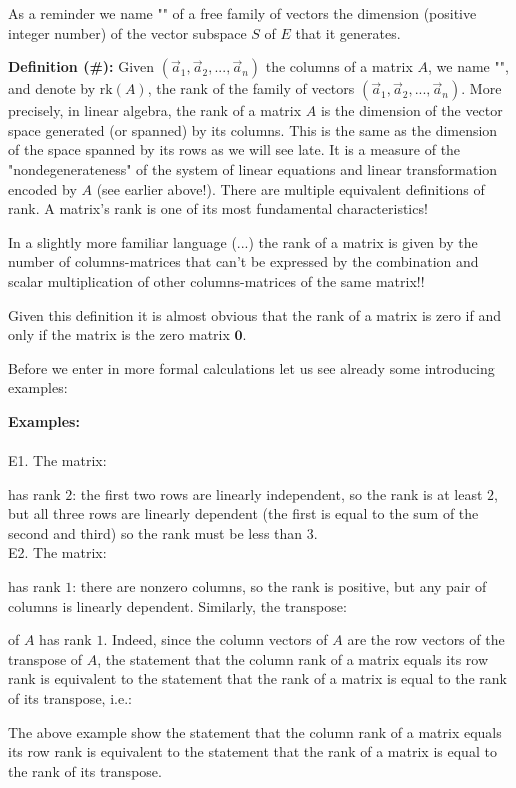 	As a reminder we name "" of a free family of vectors the dimension (positive integer number) of the vector subspace $S$ of $E$ that it generates.
	
	\textbf{Definition (\#\mydef):} Given $(\vec{a}_1,\vec{a}_2,...,\vec{a}_n)$ the columns of a matrix $A$, we name "", and denote by $\text{rk}(A)$, the rank of the family of vectors $(\vec{a}_1,\vec{a}_2,...,\vec{a}_n)$. More precisely, in linear algebra, the rank of a matrix $A$ is the dimension of the vector space generated (or spanned) by its columns. This is the same as the dimension of the space spanned by its rows as we will see late. It is a measure of the "nondegenerateness" of the system of linear equations and linear transformation encoded by $A$ (see earlier above!). There are multiple equivalent definitions of rank. A matrix's rank is one of its most fundamental characteristics!
	
	In a slightly more familiar language (...) the rank of a matrix is given by the number of columns-matrices that can't be expressed by the combination and scalar multiplication of other columns-matrices of the same matrix!!
	
	Given this definition it is almost obvious that the rank of a matrix is zero if and only if the matrix is the zero matrix $\mathbf{0}$.
	
	Before we enter in more formal calculations let us see already some introducing examples:
	\begin{tcolorbox}[colframe=black,colback=white,sharp corners]
	\textbf{{\Large {}}Examples:}\\\\
	E1. The matrix:
	
	has rank $2$: the first two rows are linearly independent, so the rank is at least $2$, but all three rows are linearly dependent (the first is equal to the sum of the second and third) so the rank must be less than $3$.\\
	
	E2. The matrix:
	
	has rank $1$: there are nonzero columns, so the rank is positive, but any pair of columns is linearly dependent. Similarly, the transpose:
	
	of $A$ has rank $1$. Indeed, since the column vectors of $A$ are the row vectors of the transpose of $A$, the statement that the column rank of a matrix equals its row rank is equivalent to the statement that the rank of a matrix is equal to the rank of its transpose, i.e.:
	
	\end{tcolorbox}
	The above example show the statement that the column rank of a matrix equals its row rank is equivalent to the statement that the rank of a matrix is equal to the rank of its transpose.
	
